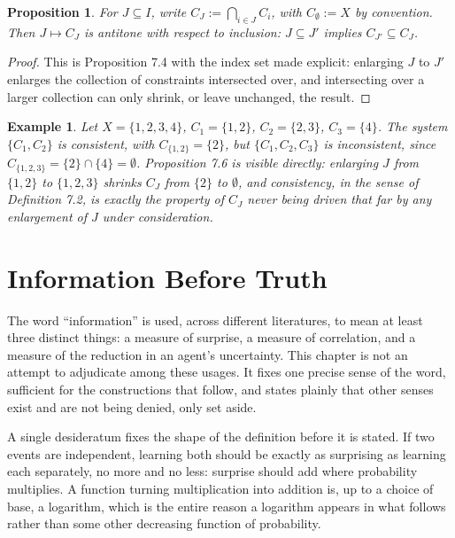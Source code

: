 \documentclass[11pt]{book}
\newtheorem{proposition}[theorem]{Proposition}
\newtheorem{example}[theorem]{Example}
\begin{document}
\begin{proposition}
For $J \subseteq I$, write $C_J := \bigcap_{i \in J} C_i$, with $C_\emptyset := X$ by convention. Then $J \mapsto C_J$ is antitone with respect to inclusion: $J \subseteq J'$ implies $C_{J'} \subseteq C_J$.
\end{proposition}

\begin{proof}
This is Proposition 7.4 with the index set made explicit: enlarging $J$ to $J'$ enlarges the collection of constraints intersected over, and intersecting over a larger collection can only shrink, or leave unchanged, the result.
\end{proof}

\begin{example}
Let $X = \{1,2,3,4\}$, $C_1 = \{1,2\}$, $C_2 = \{2,3\}$, $C_3 = \{4\}$. The system $\{C_1, C_2\}$ is consistent, with $C_{\{1,2\}} = \{2\}$, but $\{C_1, C_2, C_3\}$ is inconsistent, since $C_{\{1,2,3\}} = \{2\} \cap \{4\} = \emptyset$. Proposition 7.6 is visible directly: enlarging $J$ from $\{1,2\}$ to $\{1,2,3\}$ shrinks $C_J$ from $\{2\}$ to $\emptyset$, and consistency, in the sense of Definition 7.2, is exactly the property of $C_J$ never being driven that far by any enlargement of $J$ under consideration.
\end{example}

\chapter{Information Before Truth}

The word ``information'' is used, across different literatures, to mean at least three distinct things: a measure of surprise, a measure of correlation, and a measure of the reduction in an agent's uncertainty. This chapter is not an attempt to adjudicate among these usages. It fixes one precise sense of the word, sufficient for the constructions that follow, and states plainly that other senses exist and are not being denied, only set aside.

A single desideratum fixes the shape of the definition before it is stated. If two events are independent, learning both should be exactly as surprising as learning each separately, no more and no less: surprise should add where probability multiplies. A function turning multiplication into addition is, up to a choice of base, a logarithm, which is the entire reason a logarithm appears in what follows rather than some other decreasing function of probability.
\end{document}
